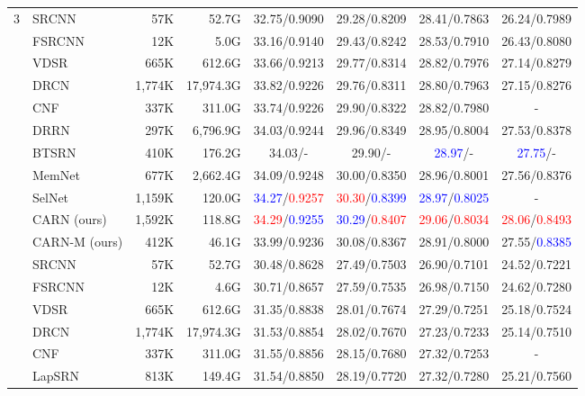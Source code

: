 \documentclass[runningheads]{llncs}
\newcommand{\blue}[1]{\textcolor{blue}{#1}}
\newcommand{\red}[1]{\textcolor{red}{#1}}
\newcommand\Tstrut{\rule{0pt}{2.5ex}}
\newcommand\Bstrut{\rule[-1ex]{0pt}{0pt}}
\def\HS{\hspace{\fontdimen2\font}}
\def\HSE{\HS\HS\HS\HS\HS\HS\HS\HS}
\begin{document}
\begin{table}[t]
\begin{center}
\begin{tabular}{c l r r c c c c}
\multirow{11}{*}{3} & SRCNN\cite{srcnn2014}
                           & 57K    & 52.7G    & 32.75/0.9090 & 29.28/0.8209 & 28.41/0.7863 & 26.24/0.7989 \\
& FSRCNN\cite{fsrcnn2016}  & 12K    & 5.0G     & 33.16/0.9140 & 29.43/0.8242 & 28.53/0.7910 & 26.43/0.8080 \\
& VDSR\cite{vdsr2016}      & 665K   & 612.6G   & 33.66/0.9213 & 29.77/0.8314 & 28.82/0.7976 & 27.14/0.8279 \\
& DRCN\cite{drcn2016}      & 1,774K & 17,974.3G & 33.82/0.9226 & 29.76/0.8311 & 28.80/0.7963 & 27.15/0.8276 \\
& CNF\cite{cnf2017}        & 337K   & 311.0G   & 33.74/0.9226 & 29.90/0.8322 & 28.82/0.7980 & -\\
& DRRN\cite{drnn2017}      & 297K   & 6,796.9G & 34.03/0.9244 & 29.96/0.8349 & 28.95/0.8004 & 27.53/0.8378 \\
& BTSRN\cite{btsrn2017}    & 410K   & 176.2G   & 34.03/-\HSE  & 29.90/-\HSE  & \blue{28.97}/-\HSE & \blue{27.75}/-\HSE \\
& MemNet\cite{memnet}      & 677K   & 2,662.4G   & 34.09/0.9248 & 30.00/0.8350 & 28.96/0.8001 & 27.56/0.8376 \\
& SelNet\cite{selnet}      & 1,159K & 120.0G   & \blue{34.27}/\red{0.9257}  & \red{30.30}/\blue{0.8399}  & \blue{28.97}/\blue{0.8025} & - \\
& CARN (ours)              & 1,592K & 118.8G   & \red{34.29}/\blue{0.9255} & \blue{30.29}/\red{0.8407} & \red{29.06}/\red{0.8034}	& \red{28.06}/\red{0.8493} \\
& CARN-M (ours)            & 412K   & 46.1G    & 33.99/0.9236 & 30.08/0.8367 & 28.91/0.8000	& 27.55/\blue{0.8385}\Bstrut \\\hline\Tstrut
\multirow{13}{*}{4} &SRCNN\cite{srcnn2014}
                           & 57K    & 52.7G    & 30.48/0.8628 & 27.49/0.7503 & 26.90/0.7101 & 24.52/0.7221 \\
& FSRCNN\cite{fsrcnn2016}  & 12K    & 4.6G     & 30.71/0.8657 & 27.59/0.7535 & 26.98/0.7150 & 24.62/0.7280 \\
& VDSR\cite{vdsr2016}      & 665K   & 612.6G   & 31.35/0.8838 & 28.01/0.7674 & 27.29/0.7251 & 25.18/0.7524 \\
& DRCN\cite{drcn2016}      & 1,774K & 17,974.3G & 31.53/0.8854 & 28.02/0.7670 & 27.23/0.7233 & 25.14/0.7510 \\
& CNF\cite{cnf2017}        & 337K   & 311.0G   & 31.55/0.8856 & 28.15/0.7680 & 27.32/0.7253 & -\\
& LapSRN\cite{lapsrn2017}  & 813K   & 149.4G   & 31.54/0.8850 & 28.19/0.7720 & 27.32/0.7280 & 25.21/0.7560 \\

\end{tabular}
\end{center}
\end{table}
\end{document}

